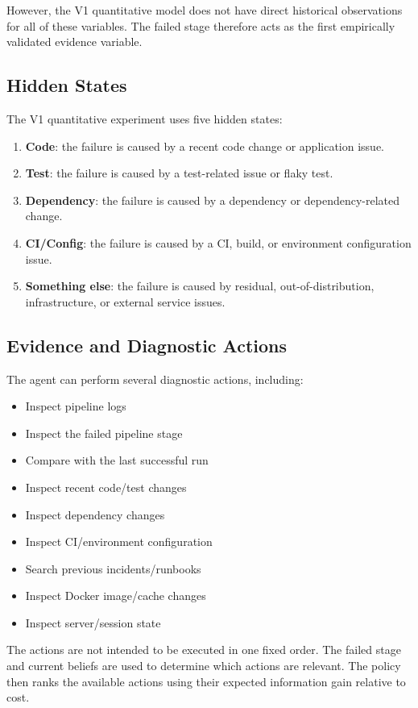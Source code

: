 \documentclass{article}
\begin{document}
However, the V1 quantitative model does not have direct historical observations for all of these variables. The failed stage therefore acts as the first empirically validated evidence variable.

\subsection{Hidden States}

The V1 quantitative experiment uses five hidden states:
\begin{enumerate}
    \item \textbf{Code}: the failure is caused by a recent code change or application issue.
    \item \textbf{Test}: the failure is caused by a test-related issue or flaky test.
    \item \textbf{Dependency}: the failure is caused by a dependency or dependency-related change.
    \item \textbf{CI/Config}: the failure is caused by a CI, build, or environment configuration issue.
    \item \textbf{Something else}: the failure is caused by residual, out-of-distribution, infrastructure, or external service issues.
\end{enumerate}

\subsection{Evidence and Diagnostic Actions}

The agent can perform several diagnostic actions, including:
\begin{itemize}
    \item Inspect pipeline logs
    \item Inspect the failed pipeline stage
    \item Compare with the last successful run
    \item Inspect recent code/test changes
    \item Inspect dependency changes
    \item Inspect CI/environment configuration
    \item Search previous incidents/runbooks
    \item Inspect Docker image/cache changes
    \item Inspect server/session state
\end{itemize}

The actions are not intended to be executed in one fixed order. The failed stage and current beliefs are used to determine which actions are relevant. The policy then ranks the available actions using their expected information gain relative to cost.
\end{document}
